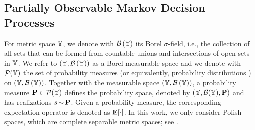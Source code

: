 \documentclass{ifacconf}
\newcommand{\new}[1]{{\color{blue}#1}}
\newcommand{\cristi}[1]{{\color{orange}#1}}
\begin{document}
%
%
%
%    
%   
%    
%    
   


\subsection{Partially Observable Markov  Decision Processes}
For metric space ${\mathbb{Y}}$, we denote with  $\mathcal{B}\left({\mathbb{Y}}\right)$ its Borel $\sigma$-field, i.e., the  
collection of all sets that can be formed from countable unions and intersections of open sets in ${\mathbb{Y}}$.
We refer to  $({\mathbb{Y}},\mathcal{B}\left({\mathbb{Y}}\right))$ as a Borel measurable space and we denote with $\mathcal P({\mathbb{Y}})$ the set of probability measures \new{(or equivalently, probability distributions )} on $({\mathbb{Y}},\mathcal{B}\left({\mathbb{Y}}\right))$.
Together with the measurable space $({\mathbb{Y}},\mathcal{B}\left({\mathbb{Y}}\right))$,  a probability measure \cristi{$\mathbf{P} \in \mathcal P({\mathbb{Y}})$} defines the probability space, denoted by $({\mathbb{Y}},\mathcal{B}({\mathbb{Y}}),\mathbf{P})$ and has realizations  $s{\,\sim\,}\mathbf{P}$.     Given a probability measure, the corresponding expectation operator is denoted as  $\mathbf{E}[\cdot]$.
In this work,  we only consider Polish spaces, which are complete separable metric spaces; see \citep{bogachev2007measure}. 
\end{document}

